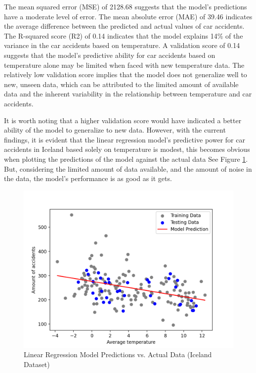 \documentclass{article}
\begin{document}
The mean squared error (MSE) of 2128.68 suggests that the model's predictions have a moderate level of error. The mean absolute error (MAE) of 39.46 indicates the average difference between the predicted and actual values of car accidents. The R-squared score (R2) of 0.14 indicates that the model explains 14\% of the variance in the car accidents based on temperature. A validation score of 0.14 suggests that the model's predictive ability for car accidents based on temperature alone may be limited when faced with new temperature data. The relatively low validation score implies that the model does not generalize well to new, unseen data, which can be attributed to the limited amount of available data and the inherent variability in the relationship between temperature and car accidents.

It is worth noting that a higher validation score would have indicated a better ability of the model to generalize to new data. However, with the current findings, it is evident that the linear regression model's predictive power for car accidents in Iceland based solely on temperature is modest, this becomes obvious when plotting the predictions of the model against the actual data See Figure \ref{fig:isl_model}. But, considering the limited amount of data available, and the amount of noise in the data, the model's performance is as good as it gets.

\begin{figure}
    \centering
    \includegraphics[scale=0.5]{../figures/highres/isl_model.png}
    \caption{Linear Regression Model Predictions vs. Actual Data (Iceland Dataset)}
    \label{fig:isl_model}
\end{figure}
\end{document}
